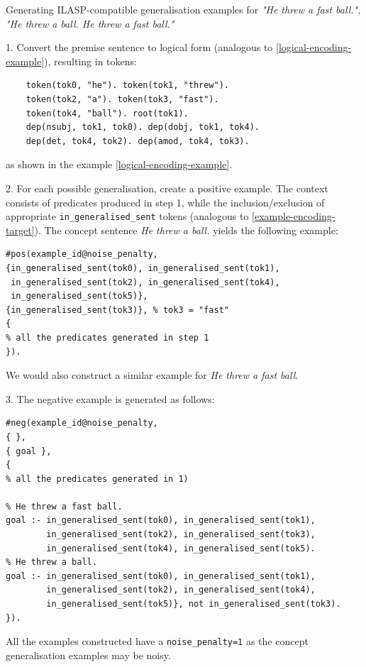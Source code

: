 \begin{example}
Generating ILASP-compatible generalisation examples for \textit{"He threw a fast ball.", "He threw a ball. He threw a fast ball."}

1. Convert the premise sentence to logical form (analogous to \ref{logical-encoding-example}), resulting in tokens:
\begin{verbatim}
    token(tok0, "he"). token(tok1, "threw").
    token(tok2, "a"). token(tok3, "fast").
    token(tok4, "ball"). root(tok1).
    dep(nsubj, tok1, tok0). dep(dobj, tok1, tok4).
    dep(det, tok4, tok2). dep(amod, tok4, tok3).
\end{verbatim}

as shown in the example \ref{logical-encoding-example}.

2. For each possible generalisation, create a positive example. The context consists of predicates produced in step 1, while the inclusion/exclusion of appropriate \verb+in_generalised_sent+ tokens (analogous to \ref{example-encoding-target}). The concept sentence \textit{He threw a ball.} yields the following example:
\begin{verbatim}
#pos(example_id@noise_penalty,
{in_generalised_sent(tok0), in_generalised_sent(tok1), 
 in_generalised_sent(tok2), in_generalised_sent(tok4), 
 in_generalised_sent(tok5)},
{in_generalised_sent(tok3)}, % tok3 = "fast"
{
% all the predicates generated in step 1
}).
\end{verbatim}
We would also construct a similar example for \textit{He threw a fast ball}.

3. The negative example is generated as follows:
\begin{verbatim}
#neg(example_id@noise_penalty,
{ },
{ goal },
{
% all the predicates generated in 1)

% He threw a fast ball.
goal :- in_generalised_sent(tok0), in_generalised_sent(tok1), 
        in_generalised_sent(tok2), in_generalised_sent(tok3), 
        in_generalised_sent(tok4), in_generalised_sent(tok5).
% He threw a ball.
goal :- in_generalised_sent(tok0), in_generalised_sent(tok1), 
        in_generalised_sent(tok2), in_generalised_sent(tok4), 
        in_generalised_sent(tok5)}, not in_generalised_sent(tok3).
}).
\end{verbatim}
\end{example}

All the examples constructed have a \verb+noise_penalty=1+ as the concept generalisation examples may be noisy.

